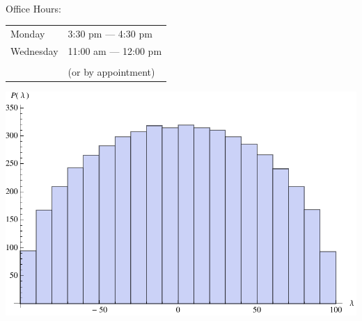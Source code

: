 \documentclass[12pt]{amsart}
\numberwithin{equation}{section}
\begin{document}
{}\ {}

\vspace{100pt}

  \begin{center}

  \huge

  \thispagestyle{empty}

  {\sc Office Hours:}

  \bigskip
  \bigskip
  \bigskip

  \begin{tabular}{ll}
  Monday &3:30 pm --- 4:30 pm\\
  Wednesday &11:00 am --- 12:00 pm\\\\
  \qquad\qquad\qquad\qquad\qquad&{(or by appointment)}
  \end{tabular}

  \vspace{80pt}

  \includegraphics{Wigner.pdf}





  \end{center}

  
\end{document}
